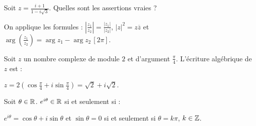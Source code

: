 \begin{question} 
Soit $z=\frac{i+1}{1-i\sqrt 3}$. Quelles sont les assertions vraies ?
\begin{answers}
    



    
\end{answers}
\begin{explanations}
On applique les formules :
$|\frac{z_1}{z_2}|= \frac{|z_1|}{|z_2|}$, $|z|^2=z\overline{z}$ et $\arg(\frac{z_1}{z_2})= \arg z_1 - \arg z_2 \, [2\pi]$. 

\end{explanations}

\end{question}



\begin{question} 
Soit $z$ un nombre complexe de module $2$ et d'argument $\frac{\pi}{4}$. L'écriture algébrique de $z$ est : 
\begin{answers}



\end{answers}
\begin{explanations}
$z=2(\cos\frac{\pi}{4}+i\sin\frac{\pi}{4}) =\sqrt 2+i\sqrt 2 $.
\end{explanations}

\end{question}


\begin{question} 
Soit $\theta \in \mathbb{R}$. $e^{i\theta}\in \mathbb{R}$  si et seulement si : 
\begin{answers}

    \bad{ $\theta  =2\pi$}


\end{answers}
\begin{explanations}
$e^{i\theta}= \cos \theta + i \sin \theta $ et $\sin \theta = 0 $ si et seulement si $\theta  =k\pi$, $k \in \mathbb{Z}$.
\end{explanations}

\end{question}


